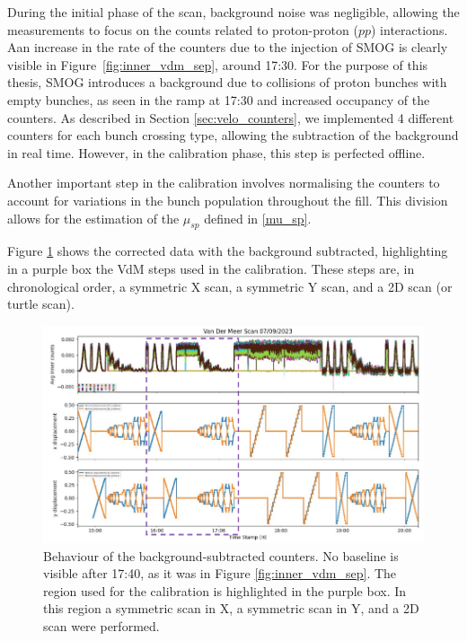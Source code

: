 During the initial phase of the scan, background noise was negligible, allowing the measurements to focus on the counts related to proton-proton ($pp$) interactions. Aan increase in the rate of the counters due to the injection of SMOG is clearly visible in Figure~\ref{fig:inner_vdm_sep}, around 17:30.  For the purpose of this thesis, SMOG introduces a background due to collisions of proton bunches with empty bunches, as seen in the ramp at 17:30 and increased occupancy of the counters.  As described in Section \ref{sec:velo_counters}, we implemented 4 different counters for each bunch crossing type, allowing the subtraction of the background in real time. However, in the calibration phase, this step is perfected offline. 

Another important step in the calibration involves normalising the counters to account for variations in the bunch population throughout the fill. This division allows for the estimation of the $\mu_{sp}$ defined in \eqref{mu_sp}. 

Figure \ref{fig:bkg_sub_calib} shows the corrected data with the background subtracted, highlighting in a purple box the VdM steps used in the calibration. These steps are, in chronological order, a symmetric X scan, a symmetric Y scan, and a 2D scan (or turtle scan). 

\begin{figure}
    \centering
    \includegraphics[width=\textwidth]{figures/calibration_period.png}
    \caption{Behaviour of the background-subtracted counters. No baseline is visible after 17:40, as it was in Figure \ref{fig:inner_vdm_sep}. The region used for the calibration is highlighted in the purple box. In this region a symmetric scan in X, a symmetric scan in Y, and a 2D scan were performed.}
    \label{fig:bkg_sub_calib}
\end{figure}

